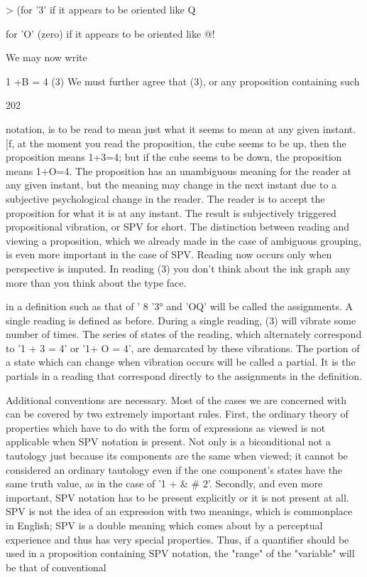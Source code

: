 \documentclass[10pt,twoside]{memoir}
\begin{document}
\begin{enumerate}
{{{{{> (for '3' if it appears to be oriented like Q 

for 'O' (zero) if it appears to be oriented like @! 

We may now write 


1 +B = 4 (3) 
We must further agree that (3), or any proposition containing such 


202 


notation, is to be read to mean just what it seems to mean at any given 
instant. [f, at the moment you read the proposition, the cube seems to be 
up, then the proposition means 1+3=4; but if the cube seems to be down, 
the proposition means 1+O=4. The proposition has an unambiguous 
meaning for the reader at any given instant, but the meaning may change in 
the next instant due to a subjective psychological change in the reader. The 
reader is to accept the proposition for what it is at any instant. The result is 
subjectively triggered propositional vibration, or SPV for short. The 
distinction between reading and viewing a proposition, which we already 
made in the case of ambiguous grouping, is even more important in the case 
of SPV. Reading now occurs only when perspective is imputed. In reading 
(3) you don't think about the ink graph any more than you think about the 
type face. 

in a definition such as that of ' 8 '3° and 'OQ' will be called the 
assignments. A single reading is defined as before. During a single reading, (3) 
will vibrate some number of times. The series of states of the reading, which 
alternately correspond to '1 + 3 = 4' or '1+ O = 4', are demarcated by 
these vibrations. The portion of a state which can change when vibration 
occurs will be called a partial. It is the partials in a reading that correspond 
directly to the assignments in the definition. 

Additional conventions are necessary. Most of the cases we are 
concerned with can be covered by two extremely important rules. First, the 
ordinary theory of properties which have to do with the form of expressions 
as viewed is not applicable when SPV notation is present. Not only is a 
biconditional not a tautology just because its components are the same when 
viewed; it cannot be considered an ordinary tautology even if the one 
component's states have the same truth value, as in the case of '1 + & # 
2'. Secondly, and even more important, SPV notation has to be present 
explicitly or it is not present at all. SPV is not the idea of an expression with 
two meanings, which is commonplace in English; SPV is a double meaning 
which comes about by a perceptual experience and thus has very special 
properties. Thus, if a quantifier should be used in a proposition containing 
SPV notation, the "range" of the "variable" will be that of conventional 


}}}}}
\end{enumerate}
\end{document}
